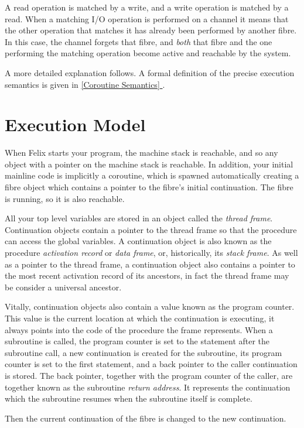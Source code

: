 \documentclass[oneside]{book}
\newcommand*{\fullref}[1]{\hyperref[{#1}]{\autoref*{#1} \nameref*{#1}}}
\begin{document}
A read operation is matched by a write, and a write operation
is matched by a read. When a matching I/O operation is performed
on a channel it means that the other operation that matches it
has already been performed by another fibre. In this case,
the channel forgets that fibre, and {\em both} that fibre and the
one performing the matching operation become active and reachable
by the system.

A more detailed explanation follows. A formal definition of the
precise execution semantics is given in \fullref{Coroutine Semantics}.

\section{Execution Model}
When Felix starts your program, the machine stack is reachable,
and so any object with a pointer on the machine stack is reachable.
In addition, your initial mainline code is implicitly a coroutine,
which is spawned automatically creating a fibre object
which contains a pointer to the fibre's initial continuation.
The fibre is running, so it is also reachable.

All your top level variables are stored in an object called
the {\em thread frame}. Continuation objects contain a pointer
to the thread frame so that the procedure can access the global
variables. A continuation object is also known as the procedure
{\em activation record} or {\em data frame}, or, historically,
its {\em stack frame}. As well as a pointer to the thread
frame, a continuation object also contains a pointer to the
most recent activation record of its ancestors, in fact the
thread frame may be consider a universal ancestor.

Vitally, continuation objects also contain a value known as
the program counter. This value is the current location at which
the continuation is executing, it always points into the code
of the procedure the frame represents. When a subroutine is
called, the program counter is set to the statement after the
subroutine call, a new continuation is created for the subroutine,
its program counter is set to the first statement, and a back pointer
to the caller continuation is stored. The back pointer, together with
the program counter of the caller, are together known as the subroutine
{\em return address}. It represents the continuation which the
subroutine resumes when the subroutine itself is complete.

Then the current continuation of the fibre is 
changed to the new continuation.
\end{document}
